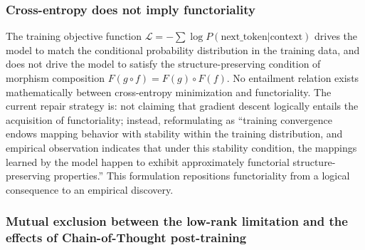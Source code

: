 \documentclass[11pt,a4paper]{article}
\theoremstyle{definition}
\begin{document}
\subsubsection{Cross-entropy does not imply functoriality}

The training objective function $\mathcal{L} = -\sum \log P(\text{next\_token}|\text{context})$ drives the model to match the conditional probability distribution in the training data, and does not drive the model to satisfy the structure-preserving condition of morphism composition $F(g \circ f) = F(g) \circ F(f)$. No entailment relation exists mathematically between cross-entropy minimization and functoriality. The current repair strategy is: not claiming that gradient descent logically entails the acquisition of functoriality; instead, reformulating as ``training convergence endows mapping behavior with stability within the training distribution, and empirical observation indicates that under this stability condition, the mappings learned by the model happen to exhibit approximately functorial structure-preserving properties.'' This formulation repositions functoriality from a logical consequence to an empirical discovery.

\subsubsection{Mutual exclusion between the low-rank limitation and the effects of Chain-of-Thought post-training}
\end{document}
